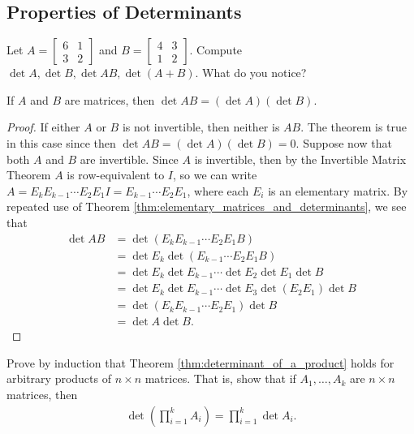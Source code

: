 \documentclass[12pt,letterpaper,reqno]{article}
\numberwithin{equation}{section}
\begin{document}
\subsection{Properties of Determinants}

\begin{exercise}
Let $A=\begin{bmatrix}
	6 & 1 \\ 3 & 2
\end{bmatrix}$ and $B=\begin{bmatrix}
	4 & 3 \\ 1 & 2
\end{bmatrix}$. Compute $\det A, \det B, \det AB, \det(A+B)$. What do you notice?	
\end{exercise}

\begin{thm}\label{thm:determinant_of_a_product}
	If $A$ and $B$ are matrices, then $\det AB=(\det A)(\det B)$.
\end{thm}

\begin{proof}
	If either $A$ or $B$ is not invertible, then neither is $AB$. The theorem is true in this case since then $\det AB=(\det A)(\det B)=0$. Suppose now that both $A$ and $B$ are invertible. Since $A$ is invertible, then by the Invertible Matrix Theorem $A$ is row-equivalent to $I$, so we can write $A=E_{k}E_{k-1}\cdots E_2E_1I=E_{k-1}\cdots E_2E_1$, where each $E_i$ is an elementary matrix. By repeated use of Theorem \ref{thm:elementary_matrices_and_determinants}, we see that 
	\begin{align*}
		\det AB&=\det (E_{k}E_{k-1}\cdots E_2 E_1 B) \\
		&=\det E_{k}\det(E_{k-1}\cdots E_2 E_1 B) \\
		&=\det E_k \det E_{k-1} \cdots \det E_2 \det E_1 \det B \\
		&=\det E_k \det E_{k-1} \cdots \det E_3 \det (E_2E_1)  \det B \\
		&=\det (E_{k}E_{k-1}\cdots E_2 E_1) \det B  \\
		&=\det A \det B.
	\end{align*}
\end{proof}

\begin{exercise}
Prove by induction that Theorem \ref{thm:determinant_of_a_product} holds for arbitrary products of $n \times n$ matrices. That is, show that if $A_1, \dots, A_k$ are $n \times n$ matrices, then 
\begin{align*}
	\det (\prod_{i=1}^k A_i)=\prod_{i=1}^k \det A_i.
\end{align*}	
\end{exercise}
\end{document}
